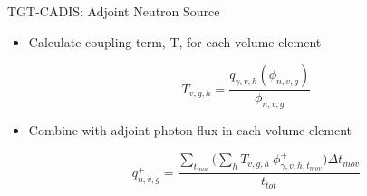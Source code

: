 \documentclass{beamer}
\begin{document}
\begin{frame}{TGT-CADIS: Adjoint Neutron Source}
	\begin{itemize}
          \item{Calculate coupling term, T, for each volume element}

	    \begin{equation}\label{eq:T}
	  	T_{v,g,h} = \dfrac{q_{\gamma,v,h}(\phi_{n,v,g})}{\phi_{n,v,g}}
	    \end{equation}

	  \item{Combine with adjoint photon flux in each volume element}

	    \begin{equation}\label{eq:tgt_n_src}
	    	q_{n,v,g}^{+} = \frac
	    	{\sum_{t_{mov}}\big(\sum_{h} T_{v,g,h} \
	    	\phi_{\gamma,v,h,t_{mov}}^{+}\big) \Delta t_{mov}}
	    	{t_{tot}}
	    \end{equation}
	\end{itemize}


\end{frame}
\end{document}
